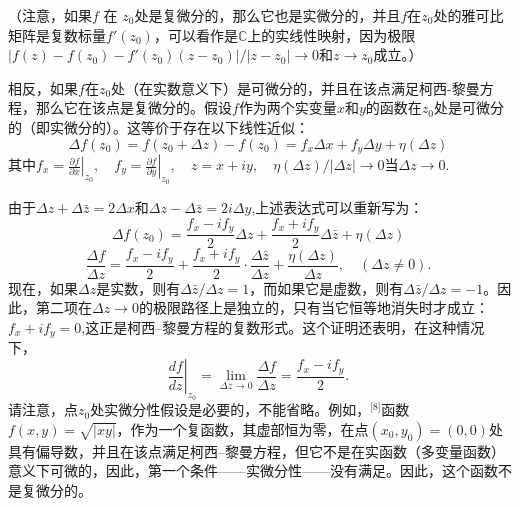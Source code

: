 （注意，如果\( f \) 在 \( z_0 \)处是复微分的，那么它也是实微分的，并且\( f \)在\( z_0 \)处的雅可比矩阵是复数标量\( f'(z_0) \)，可以看作是\( \mathbb{C} \)上的实线性映射，因为极限\(|f(z) - f(z_0) - f'(z_0)(z - z_0)|/|z - z_0| \to 0\)和\(z \to z_0\)成立。）

相反，如果\( f \)在\( z_0 \)处（在实数意义下）是可微分的，并且在该点满足柯西-黎曼方程，那么它在该点是复微分的。假设\( f \)作为两个实变量\( x \)和\( y \)的函数在\( z_0 \)处是可微分的（即实微分的）。这等价于存在以下线性近似：
\[
\Delta f(z_0) = f(z_0 + \Delta z) - f(z_0) = f_x \Delta x + f_y \Delta y + \eta(\Delta z)~
\]
其中\(f_x = \left. \frac{\partial f}{\partial x} \right|_{z_0}, \quad f_y = \left. \frac{\partial f}{\partial y} \right|_{z_0}, \quad z = x + iy, \quad \eta(\Delta z) / |\Delta z| \to 0\)当\(\Delta z \to 0\).

由于\(\Delta z + \Delta \bar{z} = 2 \Delta x \)和\(\Delta z - \Delta \bar{z} = 2i \Delta y\),上述表达式可以重新写为：
\[
\Delta f(z_0) = \frac{f_x - i f_y}{2} \Delta z + \frac{f_x + i f_y}{2} \Delta \bar{z} + \eta(\Delta z)~
\]
\[
\frac{\Delta f}{\Delta z} = \frac{f_x - i f_y}{2} + \frac{f_x + i f_y}{2} \cdot \frac{\Delta \bar{z}}{\Delta z} + \frac{\eta(\Delta z)}{\Delta z}, \quad (\Delta z \neq 0).~
\]
现在，如果\( \Delta z \)是实数，则有\(\Delta \bar{z}/\Delta z=1\)，而如果它是虚数，则有\(\Delta \bar{z}/\Delta z=-1\)。因此，第二项在\( \Delta z \to 0 \)的极限路径上是独立的，只有当它恒等地消失时才成立：\(f_x + i f_y = 0\),这正是柯西–黎曼方程的复数形式。这个证明还表明，在这种情况下，
\[
\left. \frac{df}{dz} \right|_{z_0} = \lim_{\Delta z \to 0} \frac{\Delta f}{\Delta z} = \frac{f_x - i f_y}{2}.~
\]
请注意，点\( z_0 \)处实微分性假设是必要的，不能省略。例如，\(^\text{[8]}\)函数\(f(x, y)=\sqrt{|xy|}\)，作为一个复函数，其虚部恒为零，在点\((x_0, y_0) = (0, 0)\)处具有偏导数，并且在该点满足柯西–黎曼方程，但它不是在实函数（多变量函数）意义下可微的，因此，第一个条件——实微分性——没有满足。因此，这个函数不是复微分的。